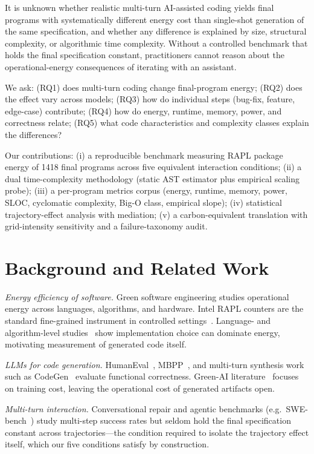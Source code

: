 \documentclass[conference]{IEEEtran}
\begin{document}
It is unknown whether realistic multi-turn AI-assisted coding yields final
programs with systematically different energy cost than single-shot
generation of the same specification, and whether any difference is explained
by size, structural complexity, or algorithmic time
complexity. Without a controlled benchmark that holds
the final specification constant, practitioners cannot reason about the
operational-energy consequences of iterating with an assistant.

We ask: (RQ1) does multi-turn coding change final-program energy; (RQ2) does
the effect vary across models; (RQ3) how do individual steps
(bug-fix, feature, edge-case) contribute; (RQ4) how do energy, runtime,
memory, power, and correctness relate; (RQ5) what code characteristics and
complexity classes explain the differences?

Our contributions: (i) a reproducible benchmark measuring RAPL package
energy of 1418 final programs across five equivalent
interaction conditions; (ii) a dual time-complexity methodology (static AST
estimator plus empirical scaling probe); (iii) a per-program metrics corpus
(energy, runtime, memory, power, SLOC, cyclomatic
complexity, Big-O class, empirical slope);
(iv) statistical trajectory-effect analysis with mediation; (v) a
carbon-equivalent translation with
grid-intensity sensitivity and a failure-taxonomy audit.

\section{Background and Related Work}
\emph{Energy efficiency of software.}
Green software engineering studies operational energy across languages,
algorithms, and hardware. Intel RAPL counters are the standard fine-grained
instrument in controlled settings~\cite{rotem2012, hahnell2012, hackenberg2013}.
Language- and algorithm-level studies~\cite{pereira2017, georgiou2022,
pinto2014} show implementation choice can dominate energy, motivating
measurement of generated code itself.

\emph{LLMs for code generation.}
HumanEval~\cite{chen2021}, MBPP~\cite{austin2021}, and multi-turn synthesis
work such as CodeGen~\cite{nijkamp2023} evaluate functional correctness.
Green-AI literature~\cite{schwartz2020, patterson2021, strubell2019} focuses
on training cost, leaving the operational cost of generated artifacts open.

\emph{Multi-turn interaction.}
Conversational repair and agentic benchmarks (e.g.\ SWE-bench~\cite{jimenez2024})
study multi-step success rates but seldom hold the final specification
constant across trajectories---the condition required to isolate the
trajectory effect itself, which our five conditions satisfy by construction.
\end{document}
